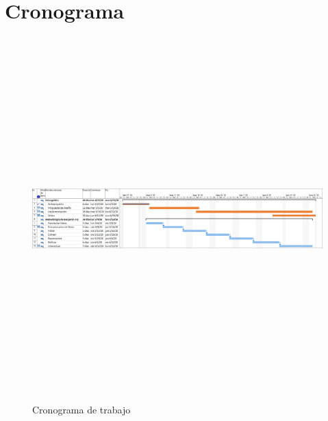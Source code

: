 \documentclass{article}
\begin{document}
\section{Cronograma}

\begin{figure}[H]
		\centering
		\includegraphics[width=18cm, height=14cm, keepaspectratio]{./img/cronograma_proyecto.png}
		\caption{Cronograma de trabajo }
		\label{fig:cronograma}
	\end{figure}



{}

\end{document}
